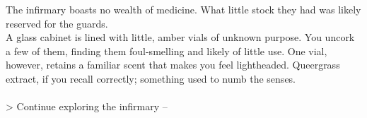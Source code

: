 The infirmary boasts no wealth of medicine. What little stock they had was likely reserved for the guards.\\

A glass cabinet is lined with little, amber vials of unknown purpose. You uncork a few of them, finding them foul-smelling and likely of little use. One vial, however, retains a familiar scent that makes you feel lightheaded. Queergrass extract, if you recall correctly; something used to numb the senses.\\
\\

> Continue exploring the infirmary -- 